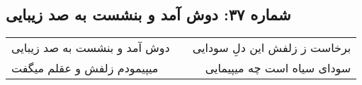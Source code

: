 \begin{center}
\section*{شماره ۳۷: دوش آمد و بنشست به صد زیبایی}
\label{sec:037}
\begin{longtable}{l p{0.5cm} r}
دوش آمد و بنشست به صد زیبایی
&&
برخاست ز زلفش این دلِ سودایی
\\
میپیمودم زلفش و عقلم میگفت
&&
سودای سیاه است چه میپیمایی
\\
\end{longtable}
\end{center}
